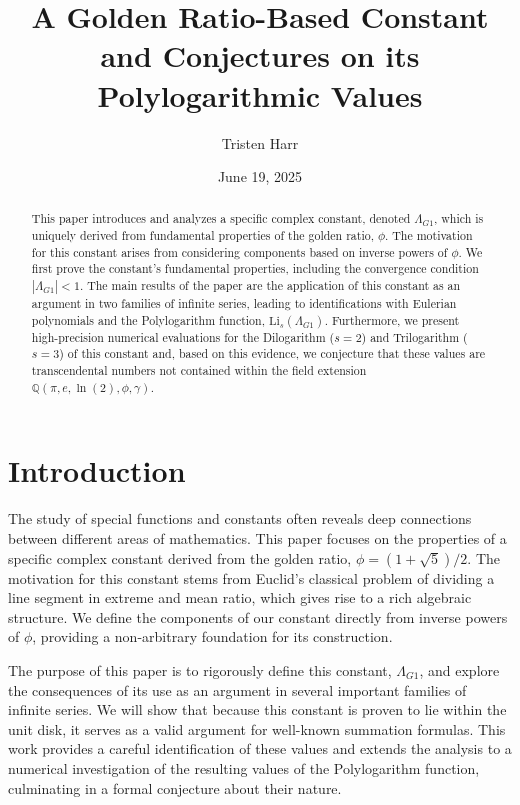 \documentclass{amsart}
\theoremstyle{plain}
\theoremstyle{definition}
\theoremstyle{remark}
\newcommand{\LambdaG}{\Lambda_{G1}}
\begin{document}
\title[A Golden Ratio Constant and its Polylogarithmic Values]{A Golden Ratio-Based Constant and Conjectures on its Polylogarithmic Values}
\author{Tristen Harr}
\date{June 19, 2025}

\begin{abstract}
This paper introduces and analyzes a specific complex constant, denoted $\LambdaG$, which is uniquely derived from fundamental properties of the golden ratio, $\phi$. The motivation for this constant arises from considering components based on inverse powers of $\phi$. We first prove the constant's fundamental properties, including the convergence condition $|\LambdaG| < 1$. The main results of the paper are the application of this constant as an argument in two families of infinite series, leading to identifications with Eulerian polynomials and the Polylogarithm function, $\mathrm{Li}_s(\LambdaG)$. Furthermore, we present high-precision numerical evaluations for the Dilogarithm ($s=2$) and Trilogarithm ($s=3$) of this constant and, based on this evidence, we conjecture that these values are transcendental numbers not contained within the field extension $\mathbb{Q}(\pi, e, \ln(2), \phi, \gamma)$.
\end{abstract}

\maketitle

\section{Introduction}
The study of special functions and constants often reveals deep connections between different areas of mathematics. This paper focuses on the properties of a specific complex constant derived from the golden ratio, $\phi = (1+\sqrt{5})/2$. The motivation for this constant stems from Euclid's classical problem of dividing a line segment in extreme and mean ratio, which gives rise to a rich algebraic structure. We define the components of our constant directly from inverse powers of $\phi$, providing a non-arbitrary foundation for its construction.

The purpose of this paper is to rigorously define this constant, $\LambdaG$, and explore the consequences of its use as an argument in several important families of infinite series. We will show that because this constant is proven to lie within the unit disk, it serves as a valid argument for well-known summation formulas. This work provides a careful identification of these values and extends the analysis to a numerical investigation of the resulting values of the Polylogarithm function, culminating in a formal conjecture about their nature.
\end{document}
